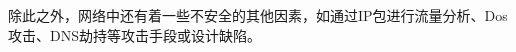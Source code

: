 \documentclass[final]{cvpr}
\newcommand{\IT}{IT\cite{98pami/Itti}}
\newcommand{\MZ}{MZ\cite{03ACMMM/Ma_Contrast-based}}
\newcommand{\GB}{GB\cite{conf/nips/HarelKP06}}
\newcommand{\SR}{SR\cite{07cvpr/hou_SpectralResidual}}
\newcommand{\FT}{FT\cite{09cvpr/Achanta_FTSaliency}}
\newcommand{\CA}{CA\cite{10cvpr/goferman_context}}
\newcommand{\LC}{LC\cite{06acmmm/ZhaiS_spatiotemporal}}
\newcommand{\AC}{AC\cite{08cvs/achanta_salient}}
\begin{document}
除此之外，网络中还有着一些不安全的其他因素，如通过IP包进行流量分析、Dos攻击、DNS劫持等攻击手段或设计缺陷。











\end{document}

